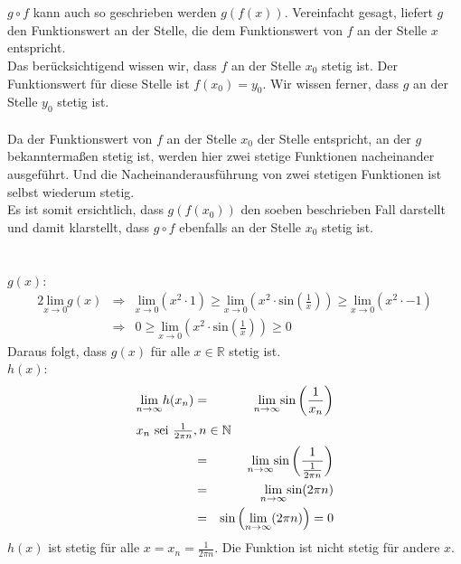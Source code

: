 \documentclass[10pt,a4paper,oneside,ngerman,numbers=noenddot]{scrartcl}
\begin{document}
\section{} %
$g \circ f$ kann auch so geschrieben werden $g(f(x))$. Vereinfacht gesagt, liefert $g$ den Funktionswert an der Stelle, die dem Funktionswert von $f$ an der Stelle $x$ entspricht.\\
Das berücksichtigend wissen wir, dass $f$ an der Stelle $x_{0}$ stetig ist. Der Funktionswert für diese Stelle ist $f(x_{0}) = y_{0}$. Wir wissen ferner, dass $g$ an der Stelle $y_{0}$ stetig ist.\\
\\
Da der Funktionswert von $f$ an der Stelle $x_{0}$ der Stelle entspricht, an der $g$ bekanntermaßen stetig ist, werden hier zwei stetige Funktionen nacheinander ausgeführt. Und die Nacheinanderausführung von zwei stetigen Funktionen ist selbst wiederum stetig.\\
Es ist somit ersichtlich, dass $g(f(x_{0}))$ den soeben beschrieben Fall darstellt und damit klarstellt, dass $g \circ f$ ebenfalls an der Stelle $x_{0}$ stetig ist.
\section{} %
$g(x)$:\\
\begin{alignat*}{2}
\underset{x \rightarrow 0}{\text{lim}} g(x) &\Rightarrow & \underset{x \rightarrow 0}{\text{lim}} (x^{2} \cdot 1 ) \geq \underset{x \rightarrow 0}{\text{lim}} \left(x^{2} \cdot \text{sin} \left(\frac{1}{x}\right) \right) \geq \underset{x \rightarrow 0}{\text{lim}} (x^{2} \cdot -1) \\
&\Rightarrow & 0 \geq \underset{x \rightarrow 0}{\text{lim}} \left(x^{2} \cdot \text{sin} \left(\frac{1}{x} \right) \right) \geq 0
\end{alignat*}
Daraus folgt, dass $g(x)$ für alle $x \in \mathbb{R}$ stetig ist. \\

$h(x)$:\\
\begin{alignat*}{2}
\underset{n \rightarrow \infty}{\text{lim}} h(x_{n}) &=& \underset{n \rightarrow \infty}{\text{lim}} \text{sin} \left( \frac{1}{x_{n}} \right) \\
\intertext{$x_{n}$ sei $\frac{1}{2\pi n}, n \in \mathbb{N}$}
&=& \underset{n \rightarrow \infty}{\text{lim}} \text{sin} \left(\frac{1}{\frac{1}{2 \pi n}}\right) \\
&=& \underset{n \rightarrow \infty}{\text{lim}} \text{sin} (2 \pi n) \\
&=& \text{sin} \left( \underset{n \rightarrow \infty}{\text{lim}} (2 \pi n) \right) = 0
\end{alignat*}
$h(x)$ ist stetig für alle $x = x_{n} = \frac{1}{2\pi n}$. Die Funktion ist nicht stetig für andere $x$.
\end{document}
